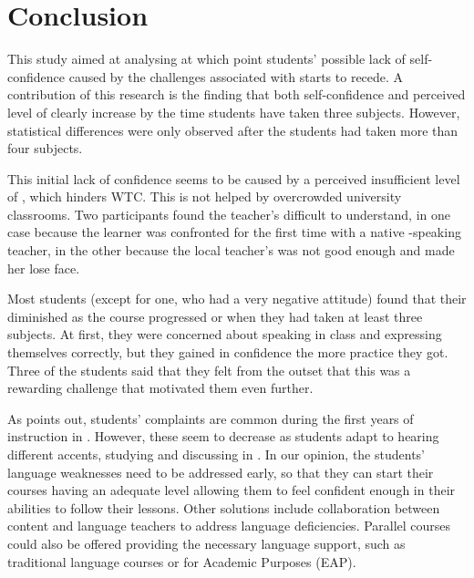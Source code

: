 \documentclass[output=paper]{langsci/langscibook}
\begin{document}
\section{Conclusion} 
 
This study aimed at analysing at which point students’ possible lack of self-confidence caused by the challenges associated with  starts to recede.  A    contribution of this research is the finding that both  self-confidence and perceived level of  clearly increase by the time students have taken three  subjects. However, statistical differences were only observed after the students had taken more than four subjects. 



This initial lack of confidence seems to be caused by a perceived insufficient level of , which hinders WTC. This is not helped by overcrowded university classrooms.  Two participants found the teacher’s  difficult to understand, in one case because the learner was confronted for the first time with a native -speaking teacher, in the other because the local teacher’s  was not good enough and made her lose face.


  
Most students (except for one, who had a very negative attitude) found that their  diminished as the course progressed or when they had taken at least three  subjects. At first, they were concerned about speaking in class and expressing themselves correctly, but they gained in confidence the more practice they got.  Three of the students said that they felt from the outset that this was a rewarding challenge that motivated them even further. 



As \citet{Wilkinson2013} points out, students’ complaints are common during the first years of instruction in . However, these seem to decrease as students adapt to hearing different accents, studying and discussing in . In our opinion, the students’ language weaknesses need to be addressed early, so that they can start their  courses having an adequate  level allowing them to feel confident enough in their  abilities to follow their lessons. Other solutions include collaboration between content and language teachers to address language deficiencies. Parallel courses could also be offered providing the necessary language support, such as traditional language courses or  for Academic Purposes (EAP). 
\end{document}
